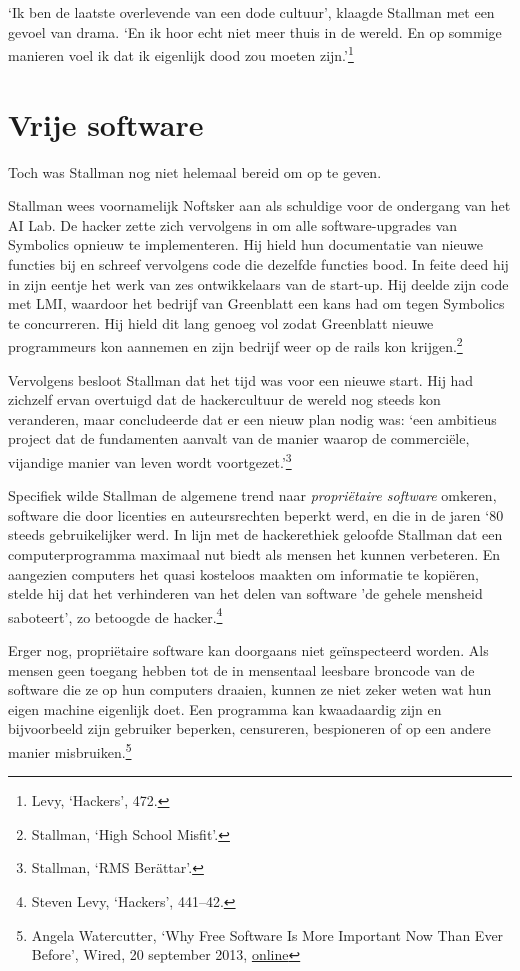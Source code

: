\documentclass[
  a5paper,
  smalldemyvopaper,11pt,twoside,onecolumn,openright,extrafontsizes]{memoir}
\begin{document}
`Ik ben de laatste overlevende van een dode cultuur', klaagde Stallman
met een gevoel van drama. `En ik hoor echt niet meer thuis in de wereld.
En op sommige manieren voel ik dat ik eigenlijk dood zou moeten
zijn.'\footnote{\hspace{0pt}Levy, `Hackers', 472.}

\section{Vrije software}\label{vrije-software}

Toch was Stallman nog niet helemaal bereid om op te geven.

Stallman wees voornamelijk Noftsker aan als schuldige voor de ondergang
van het AI Lab. De hacker zette zich vervolgens in om alle
software-upgrades van Symbolics opnieuw te implementeren. Hij hield hun
documentatie van nieuwe functies bij en schreef vervolgens code die
dezelfde functies bood. In feite deed hij in zijn eentje het werk van
zes ontwikkelaars van de start-up. Hij deelde zijn code met LMI,
waardoor het bedrijf van Greenblatt een kans had om tegen Symbolics te
concurreren. Hij hield dit lang genoeg vol zodat Greenblatt nieuwe
programmeurs kon aannemen en zijn bedrijf weer op de rails kon
krijgen.\footnote{\hspace{0pt}Stallman, `High School Misfit'.}

Vervolgens besloot Stallman dat het tijd was voor een nieuwe start. Hij
had zichzelf ervan overtuigd dat de hackercultuur de wereld nog steeds
kon veranderen, maar concludeerde dat er een nieuw plan nodig was: `een
ambitieus project dat de fundamenten aanvalt van de manier waarop de
commerciële, vijandige manier van leven wordt voortgezet.'\footnote{\hspace{0pt}Stallman,
  `RMS Berättar'.}

Specifiek wilde Stallman de algemene trend naar \emph{propriëtaire
software} omkeren, software die door licenties en auteursrechten beperkt
werd, en die in de jaren `80 steeds gebruikelijker werd. In lijn met de
hackerethiek geloofde Stallman dat een computerprogramma maximaal nut
biedt als mensen het kunnen verbeteren. En aangezien computers het quasi
kosteloos maakten om informatie te kopiëren, stelde hij dat het
verhinderen van het delen van software 'de gehele mensheid saboteert',
zo betoogde de hacker.\footnote{\hspace{0pt}Steven Levy, `Hackers',
  441--42.}

Erger nog, propriëtaire software kan doorgaans niet geïnspecteerd
worden. Als mensen geen toegang hebben tot de in mensentaal leesbare
broncode van de software die ze op hun computers draaien, kunnen ze niet
zeker weten wat hun eigen machine eigenlijk doet. Een programma kan
kwaadaardig zijn en bijvoorbeeld zijn gebruiker beperken, censureren,
bespioneren of op een andere manier misbruiken.\footnote{\hspace{0pt}Angela
  Watercutter, `Why Free Software Is More Important Now Than Ever
  Before', Wired, 20 september 2013,
  \href{https://www.wired.com/2013/09/why-free-software-is-more-important-now-than-ever-before/}{online}}
\end{document}
